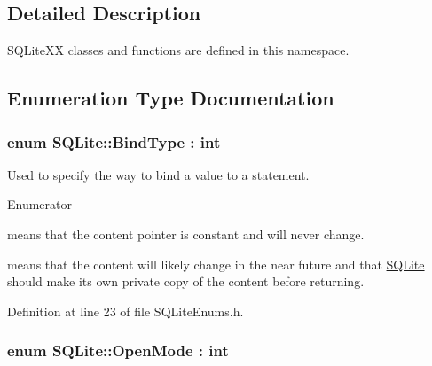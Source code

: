 \subsection{Detailed Description}
S\-Q\-Lite\-X\-X classes and functions are defined in this namespace. 

\subsection{Enumeration Type Documentation}
\hypertarget{a00038_a32877e51b309dd8f2a28c21c0ba4a6fd}{
\subsubsection[{Bind\-Type}]{\setlength{\rightskip}{0pt plus 5cm}enum {\bf S\-Q\-Lite\-::\-Bind\-Type} \-: int\hspace{0.3cm}{\ttfamily [strong]}}}\label{a00038_a32877e51b309dd8f2a28c21c0ba4a6fd}


Used to specify the way to bind a value to a statement. 

\begin{Desc}
\item[Enumerator]\par
\begin{description}
\item[{\em 
\hypertarget{a00038_a32877e51b309dd8f2a28c21c0ba4a6fda84a8921b25f505d0d2077aeb5db4bc16}{Static}\label{a00038_a32877e51b309dd8f2a28c21c0ba4a6fda84a8921b25f505d0d2077aeb5db4bc16}
}]means that the content pointer is constant and will never change. \item[{\em 
\hypertarget{a00038_a32877e51b309dd8f2a28c21c0ba4a6fdab1f023eff9a6b5308d6024e4c6b3d475}{Transient}\label{a00038_a32877e51b309dd8f2a28c21c0ba4a6fdab1f023eff9a6b5308d6024e4c6b3d475}
}]means that the content will likely change in the near future and that \hyperlink{a00038}{S\-Q\-Lite} should make its own private copy of the content before returning. \end{description}
\end{Desc}


Definition at line 23 of file S\-Q\-Lite\-Enums.\-h.

\hypertarget{a00038_a0d8721ab00cfcf85ba4eed715ccfecec}{
\subsubsection[{Open\-Mode}]{\setlength{\rightskip}{0pt plus 5cm}enum {\bf S\-Q\-Lite\-::\-Open\-Mode} \-: int\hspace{0.3cm}{\ttfamily [strong]}}}\label{a00038_a0d8721ab00cfcf85ba4eed715ccfecec}


